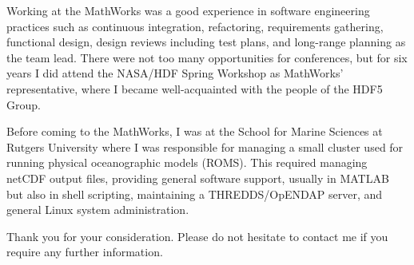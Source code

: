 \documentclass[11pt]{moderncv}  %
\begin{document}
Working at the MathWorks was a good experience in software engineering practices such as continuous integration, refactoring, requirements gathering, functional design, design reviews including test plans, and long-range planning as the team lead.   There were not too many opportunities for conferences, but for six years I did attend the NASA/HDF Spring Workshop as MathWorks’ representative, where I became well-acquainted with the people of the HDF5 Group.

Before coming to the MathWorks, I was at the School for Marine Sciences at Rutgers University where I was responsible for managing a small cluster used for running physical oceanographic models (ROMS).  This required managing  netCDF output files, providing general software support, usually in MATLAB but also in shell scripting, maintaining a THREDDS/OpENDAP server, and general Linux system administration.

Thank you for your consideration.  Please do not hesitate to contact me if you require any further information.

\makeletterclosing
\end{document}

